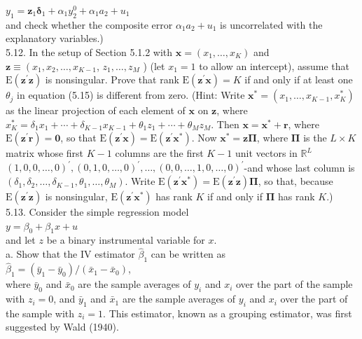 \documentclass[10pt]{article}
\begin{document}
$y_{1}=\mathbf{z}_{1} \boldsymbol{\delta}_{1}+\alpha_{1} y_{2}^{0}+\alpha_{1} a_{2}+u_{1}$\\
and check whether the composite error $\alpha_{1} a_{2}+u_{1}$ is uncorrelated with the explanatory variables.)\\
5.12. In the setup of Section 5.1.2 with $\mathbf{x}=\left(x_{1}, \ldots, x_{K}\right)$ and $\mathbf{z} \equiv\left(x_{1}, x_{2}, \ldots, x_{K-1}\right.$, $z_{1}, \ldots, z_{M}$ ) (let $x_{1}=1$ to allow an intercept), assume that $\mathrm{E}\left(\mathbf{z}^{\prime} \mathbf{z}\right)$ is nonsingular. Prove that rank $\mathrm{E}\left(\mathbf{z}^{\prime} \mathbf{x}\right)=K$ if and only if at least one $\theta_{j}$ in equation (5.15) is different from zero. (Hint: Write $\mathbf{x}^{*}=\left(x_{1}, \ldots, x_{K-1}, x_{K}^{*}\right)$ as the linear projection of each element of $\mathbf{x}$ on $\mathbf{z}$, where $x_{K}^{*}=\delta_{1} x_{1}+\cdots+\delta_{K-1} x_{K-1}+\theta_{1} z_{1}+\cdots+\theta_{M} z_{M}$. Then $\mathbf{x}= \mathbf{x}^{*}+\mathbf{r}$, where $\mathrm{E}\left(\mathbf{z}^{\prime} \mathbf{r}\right)=\mathbf{0}$, so that $\mathrm{E}\left(\mathbf{z}^{\prime} \mathbf{x}\right)=\mathrm{E}\left(\mathbf{z}^{\prime} \mathbf{x}^{*}\right)$. Now $\mathbf{x}^{*}=\mathbf{z} \boldsymbol{\Pi}$, where $\boldsymbol{\Pi}$ is the $L \times K$ matrix whose first $K-1$ columns are the first $K-1$ unit vectors in $\mathbb{R}^{L}$ $(1,0,0, \ldots, 0)^{\prime},(0,1,0, \ldots, 0)^{\prime}, \ldots,(0,0, \ldots, 1,0, \ldots, 0)^{\prime}$-and whose last column is $\left(\delta_{1}, \delta_{2}, \ldots, \delta_{K-1}, \theta_{1}, \ldots, \theta_{M}\right)$. Write $\mathrm{E}\left(\mathbf{z}^{\prime} \mathbf{x}^{*}\right)=\mathrm{E}\left(\mathbf{z}^{\prime} \mathbf{z}\right) \boldsymbol{\Pi}$, so that, because $\mathrm{E}\left(\mathbf{z}^{\prime} \mathbf{z}\right)$ is nonsingular, $\mathrm{E}\left(\mathbf{z}^{\prime} \mathbf{x}^{*}\right)$ has rank $K$ if and only if $\boldsymbol{\Pi}$ has rank $K$.)\\
5.13. Consider the simple regression model\\
$y=\beta_{0}+\beta_{1} x+u$\\
and let $z$ be a binary instrumental variable for $x$.\\
a. Show that the IV estimator $\hat{\beta}_{1}$ can be written as\\
$\hat{\beta}_{1}=\left(\bar{y}_{1}-\bar{y}_{0}\right) /\left(\bar{x}_{1}-\bar{x}_{0}\right)$,\\
where $\bar{y}_{0}$ and $\bar{x}_{0}$ are the sample averages of $y_{i}$ and $x_{i}$ over the part of the sample with $z_{i}=0$, and $\bar{y}_{1}$ and $\bar{x}_{1}$ are the sample averages of $y_{i}$ and $x_{i}$ over the part of the sample with $z_{i}=1$. This estimator, known as a grouping estimator, was first suggested by Wald (1940).\\
\end{document}
